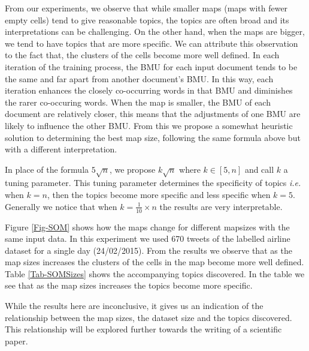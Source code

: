 \documentclass{article}
\begin{document}
From our experiments, we observe that while smaller maps (maps with fewer empty cells) tend to give reasonable topics, the topics are often broad and its interpretations can be challenging. On the other hand, when the maps are bigger, we tend to have topics that are more specific. We can attribute this observation to the fact that, the clusters of the cells become more well defined. In each iteration of the training process, the BMU for each input document tends to be the same and far apart from another document's  BMU. In this way, each iteration enhances the closely co-occurring words in that BMU and diminishes the rarer co-occuring words. When the map is smaller, the BMU of each document are relatively closer, this means that the adjustments of one BMU are likely to influence the other BMU. From this we propose a somewhat heuristic solution to determining the best map size, following the same formula above but with a different interpretation. 

In place of the formula $5\sqrt{n}$, we propose $k\sqrt{n}$ where $k\in[5,{n}]$ and call $k$  a tuning parameter. This tuning parameter determines the specificity of topics \emph{i.e.} when  $k = {n}$, then the topics  become more specific and less specific when $k = 5$.  
Generally we notice that when $k=\frac{1}{10} \times n$ the results are very interpretable.

Figure \ref{Fig-SOM} shows how the maps change for different mapsizes with the same input data. In this experiment we used 670 tweets of the labelled airline dataset for a single day (24/02/2015). From the results we observe that as the map sizes increases the clusters of the cells in the map become more well defined. Table \ref{Tab-SOMSizes} shows the accompanying topics discovered. In the table we see that as the map sizes increases the topics become more specific. 

While the results here are inconclusive, it gives us an indication of the relationship between the map sizes, the dataset size and the topics discovered. This relationship will be explored further towards the writing of a scientific paper.
\end{document}
